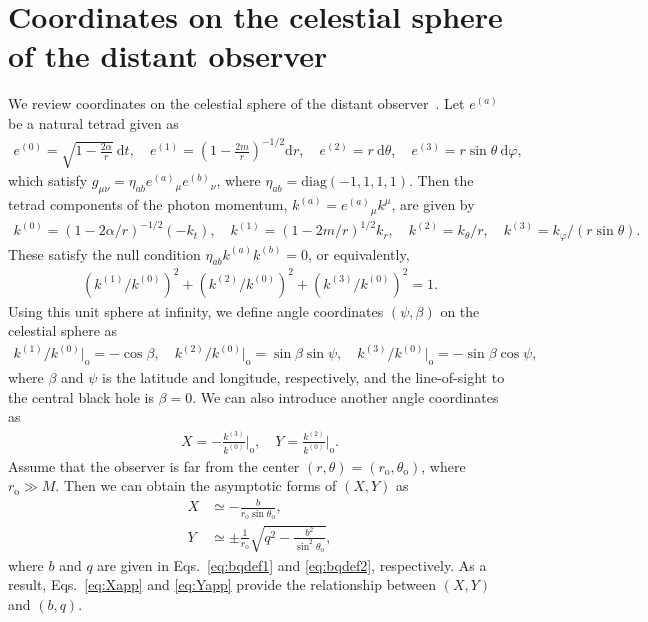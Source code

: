 \documentclass[aps,11pt,nofootinbib,preprintnumbers,groupedaddress,superscriptaddress]{revtex4-2}
\begin{document}
\section{Coordinates on the celestial sphere of the distant observer}
\label{sec:B}
We review
coordinates on the celestial sphere of the distant observer~\cite{Bardeen:1973}. 
Let $e^{(a)}$ be a natural tetrad given as
\begin{align}
e^{(0)}=\sqrt{1-\frac{2\alpha}{r}}\:\!\mathrm{d}t,
\quad 
e^{(1)}=\left(1-\frac{2m}{r}\right)^{-1/2} \mathrm{d}r,
\quad 
e^{(2)}=r\:\!\mathrm{d}\theta,
\quad 
e^{(3)}=r\sin\theta \:\!\mathrm{d}\varphi,
\end{align}
which satisfy $g_{\mu\nu}=\eta_{ab}e^{(a)}{}_\mu e^{(b)}{}_\nu$, 
where $\eta_{ab}=\mathrm{diag}(-1,1,1,1)$. Then the tetrad components of the photon momentum, $k^{(a)}=e^{(a)}{}_\mu k^\mu$, are given by
\begin{align}
k^{(0)}=\left(1-2\alpha/r\right)^{-1/2}(-k_t),
\quad
k^{(1)}=\left(1-2m/r\right)^{1/2} k_r,
\quad
k^{(2)}=k_\theta/r,
\quad
k^{(3)}=k_\varphi/(r\sin\theta).
\end{align}
These satisfy the null condition $\eta_{ab} k^{(a)} k^{(b)}=0$,
or equivalently, 
\begin{align}
\label{eq:ncondcele}
(k^{(1)}/k^{(0)})^2+(k^{(2)}/k^{(0)})^2+(k^{(3)}/k^{(0)})^2=1.
\end{align}
Using this unit sphere at infinity, 
we define angle coordinates $(\psi, \beta)$ on the celestial sphere as
\begin{align}
k^{(1)}/k^{(0)}\big|_{\mathrm{o}}=-\cos \beta,
\quad
k^{(2)}/k^{(0)}\big|_{\mathrm{o}}=\sin \beta \sin \psi,
\quad
k^{(3)}/k^{(0)}\big|_{\mathrm{o}}=-\sin\beta \cos \psi,
\end{align}
where $\beta$ and $\psi$ is the latitude and longitude, respectively, 
and the line-of-sight to the central black hole is $\beta=0$. 
We can also introduce 
another angle coordinates as 
\begin{align}
X=-\frac{k^{(3)}}{k^{(0)}}\bigg|_{\mathrm{o}},
\quad
Y=\frac{k^{(2)}}{k^{(0)}}\bigg|_{\mathrm{o}}.
\end{align}
Assume that the observer is far from the center $(r,\theta)=(r_{\mathrm{o}}, \theta_{\mathrm{o}})$, where $r_{\mathrm{o}}\gg M$. 
Then 
we can obtain the 
asymptotic forms
of $(X, Y)$ as 
\begin{align}
\label{eq:Xapp}
X&
\simeq 
-\frac{b}{r_{\mathrm{o}}\sin \theta_{\mathrm{o}}},
\\
\label{eq:Yapp}
Y&
\simeq 
\pm \frac{1}{r_{\mathrm{o}}}\sqrt{q^2-\frac{b^2}{\sin^2\theta_{\mathrm{o}}}},
\end{align}
where $b$ and $q$ are given in Eqs.~\eqref{eq:bqdef1} and \eqref{eq:bqdef2}, respectively. 
As a result, Eqs.~\eqref{eq:Xapp} and \eqref{eq:Yapp} provide the relationship between $(X,Y)$ and $(b,q)$. 
\end{document}
